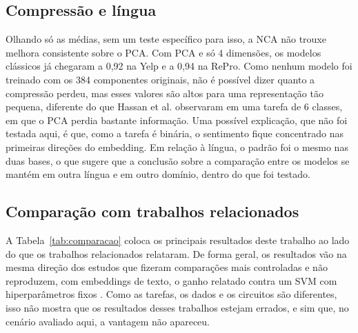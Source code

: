 \documentclass[conference]{IEEEtran}
\begin{document}
\subsection{Compressão e língua}
Olhando só as médias, sem um teste específico para isso, a NCA não trouxe melhora consistente sobre o PCA. Com PCA e só 4 dimensões, os modelos clássicos já chegaram a 0,92 na Yelp e a 0,94 na RePro. Como nenhum modelo foi treinado com os 384 componentes originais, não é possível dizer quanto a compressão perdeu, mas esses valores são altos para uma representação tão pequena, diferente do que Hassan et al. \cite{hassan2026} observaram em uma tarefa de 6 classes, em que o PCA perdia bastante informação. Uma possível explicação, que não foi testada aqui, é que, como a tarefa é binária, o sentimento fique concentrado nas primeiras direções do embedding. Em relação à língua, o padrão foi o mesmo nas duas bases, o que sugere que a conclusão sobre a comparação entre os modelos se mantém em outra língua e em outro domínio, dentro do que foi testado.

\subsection{Comparação com trabalhos relacionados}
A Tabela~\ref{tab:comparacao} coloca os principais resultados deste trabalho ao lado do que os trabalhos relacionados relataram. De forma geral, os resultados vão na mesma direção dos estudos que fizeram comparações mais controladas \cite{bowles2024,kolle2024} e não reproduzem, com embeddings de texto, o ganho relatado contra um SVM com hiperparâmetros fixos \cite{cajas2025}. Como as tarefas, os dados e os circuitos são diferentes, isso não mostra que os resultados desses trabalhos estejam errados, e sim que, no cenário avaliado aqui, a vantagem não apareceu.
\end{document}
